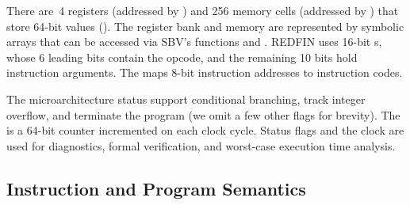 



There are~4 registers (addressed by ) and 256 memory cells (addressed
by ) that store 64-bit values (). The register bank and
memory are represented by symbolic arrays
that can be accessed via SBV's functions  and .
REDFIN uses 16-bit s, whose 6 leading bits contain the
opcode, and the remaining 10 bits hold instruction arguments. The 
maps 8-bit instruction addresses to instruction codes.

The microarchitecture status  support conditional branching, track
integer overflow, and terminate the program (we omit a few other flags for
brevity).
The  is a 64-bit counter
incremented on each clock cycle. Status flags and the clock are used for
diagnostics, formal verification, and worst-case execution time analysis.

\subsection{Instruction and Program Semantics}

